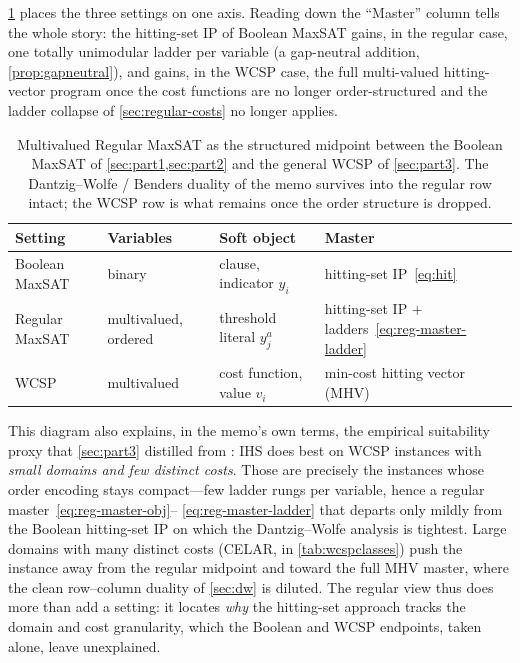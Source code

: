 \cref{tab:spectrum} places the three settings on one axis. Reading down the
``Master'' column tells the whole story: the hitting-set IP of Boolean MaxSAT
gains, in the regular case, one totally unimodular ladder per variable (a
gap-neutral addition, \cref{prop:gapneutral}), and gains, in the WCSP case, the
full multi-valued hitting-vector program once the cost functions are no longer
order-structured and the ladder collapse of \cref{sec:regular-costs} no longer
applies.

\begin{table}[htbp]
\centering
\small
\setlength{\tabcolsep}{5pt}
\caption{Multivalued Regular MaxSAT as the structured midpoint between the
Boolean MaxSAT of \cref{sec:part1,sec:part2} and the general WCSP of
\cref{sec:part3}. The Dantzig--Wolfe / Benders duality of the memo survives
into the regular row intact; the WCSP row is what remains once the order
structure is dropped.}
\label{tab:spectrum}
\begin{tabular}{@{}llll@{}}
\toprule
\textbf{Setting} & \textbf{Variables} & \textbf{Soft object} & \textbf{Master} \\
\midrule
Boolean MaxSAT & binary & clause, indicator $y_i$ & hitting-set IP~\eqref{eq:hit} \\
Regular MaxSAT & multivalued, ordered & threshold literal $y_j^{a}$ & hitting-set IP $+$ ladders~\eqref{eq:reg-master-ladder} \\
WCSP & multivalued & cost function, value $v_i$ & min-cost hitting vector (MHV) \\
\bottomrule
\end{tabular}
\end{table}

This diagram also explains, in the memo's own terms, the empirical suitability
proxy that \cref{sec:part3} distilled from \citet{petrova2025empirical}: IHS
does best on WCSP instances with \emph{small domains and few distinct costs}.
Those are precisely the instances whose order encoding stays compact---few
ladder rungs per variable, hence a regular master~\eqref{eq:reg-master-obj}--%
\eqref{eq:reg-master-ladder} that departs only mildly from the Boolean
hitting-set IP on which the Dantzig--Wolfe analysis is tightest. Large domains
with many distinct costs (CELAR, in \cref{tab:wcspclasses}) push the instance
away from the regular midpoint and toward the full MHV master, where the clean
row--column duality of \cref{sec:dw} is diluted. The regular view thus does more
than add a setting: it locates \emph{why} the hitting-set approach tracks the
domain and cost granularity, which the Boolean and WCSP endpoints, taken alone,
leave unexplained.
